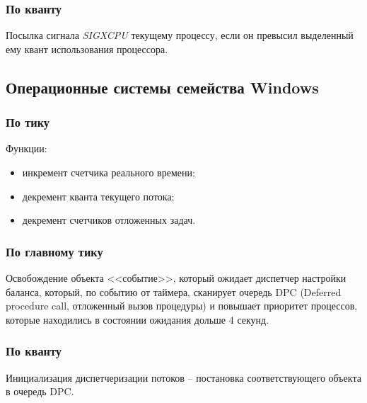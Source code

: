 \subsubsection{По кванту}

Посылка сигнала \textit{SIGXCPU} текущему процессу, если он превысил выделенный ему квант использования процессора.

\subsection{Операционные системы семейства Windows}

\subsubsection{По тику}

Функции:
\begin{itemize}[label*=---]
	\item инкремент счетчика реального времени;
	\item декремент кванта текущего потока;
	\item декремент счетчиков отложенных задач.
\end{itemize}

\subsubsection{По главному тику}

Освобождение объекта <<событие>>, который ожидает диспетчер настройки баланса, который, по событию от таймера, сканирует очередь DPC (Deferred procedure call, отложенный вызов процедуры) и повышает приоритет процессов, которые находились в состоянии ожидания дольше 4 секунд.

\subsubsection{По кванту}

Инициализация диспетчеризации потоков -- постановка соответствующего объекта в очередь DPC.

